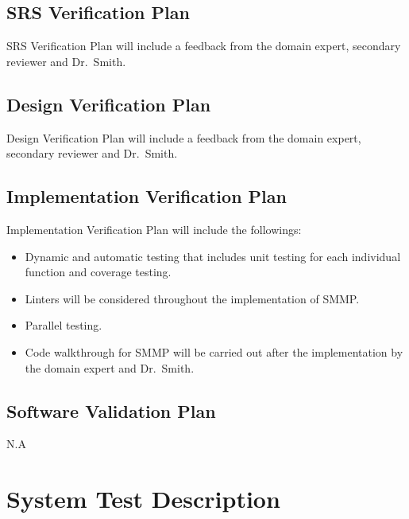 \documentclass[12pt, titlepage]{article}
\begin{document}

\subsection{SRS Verification Plan}

SRS Verification Plan will include a feedback from the domain expert, secondary
reviewer and Dr.\ Smith.


\subsection{Design Verification Plan}

Design Verification Plan will include a feedback from the domain expert,
secondary reviewer and Dr.\ Smith.

\subsection{Implementation Verification Plan}

Implementation Verification Plan will include the followings:
\begin{itemize}
\item Dynamic and automatic testing that includes unit testing for each
individual function and coverage testing. 
\item Linters will be considered throughout the implementation of
  SMMP. 
\item Parallel testing.
\item Code walkthrough for SMMP will be carried out after the implementation by
the domain expert and Dr.\ Smith. 
\end{itemize}

\subsection{Software Validation Plan} N.A 

\section{System Test Description}
\end{document}
